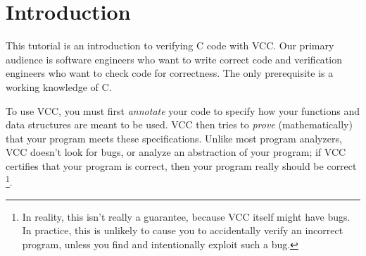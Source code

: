 \section{Introduction}
This tutorial is an introduction to verifying C code with VCC. Our
primary audience is software engineers who want to write correct code
and verification engineers who want to check code for correctness.
The only prerequisite is a working knowledge of C.

To use VCC, you must first \emph{annotate} your code to specify how
your functions and data structures are meant to be used.
VCC then tries to \emph{prove} (mathematically) that
your program meets these specifications.  Unlike most program
analyzers, VCC doesn't look for bugs, or analyze an abstraction of
your program; if VCC certifies that your program is correct, then your
program really should be correct%
\footnote{
  In reality, this isn't
  really a guarantee, because VCC itself might have bugs. In
  practice, this is unlikely to cause you to accidentally verify an
  incorrect program, unless you find and intentionally exploit such a
  bug. 

  }. 

